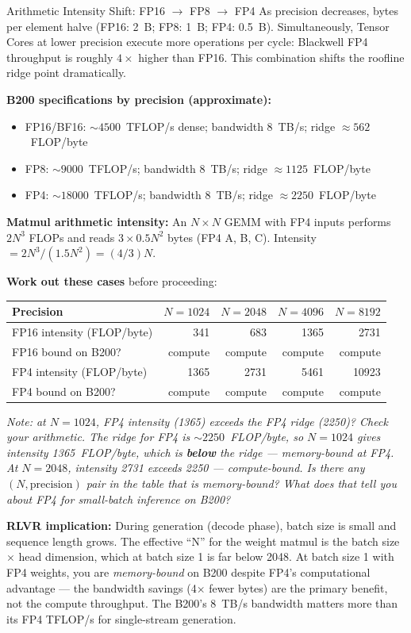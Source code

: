 \begin{thinkfirst}{Arithmetic Intensity Shift: FP16 $\to$ FP8 $\to$ FP4}
As precision decreases, bytes per element halve (FP16: 2~B; FP8: 1~B; FP4: 0.5~B). Simultaneously, Tensor Cores at lower precision execute more operations per cycle: Blackwell FP4 throughput is roughly $4\times$ higher than FP16. This combination shifts the roofline ridge point dramatically.

\textbf{B200 specifications by precision (approximate):}
\begin{itemize}
  \item FP16/BF16: $\sim 4500$~TFLOP/s dense; bandwidth 8~TB/s; ridge $\approx 562$~FLOP/byte
  \item FP8: $\sim 9000$~TFLOP/s; bandwidth 8~TB/s; ridge $\approx 1125$~FLOP/byte
  \item FP4: $\sim 18000$~TFLOP/s; bandwidth 8~TB/s; ridge $\approx 2250$~FLOP/byte
\end{itemize}

\textbf{Matmul arithmetic intensity:} An $N \times N$ GEMM with FP4 inputs performs $2N^3$ FLOPs and reads $3 \times 0.5N^2$ bytes (FP4 A, B, C). Intensity $= 2N^3 / (1.5N^2) = (4/3)N$.

\textbf{Work out these cases} before proceeding:

\begin{center}
\begin{tabular}{lrrrr}
\hline
\textbf{Precision} & $N=1024$ & $N=2048$ & $N=4096$ & $N=8192$ \\
\hline
FP16 intensity (FLOP/byte) & 341 & 683 & 1365 & 2731 \\
FP16 bound on B200? & compute & compute & compute & compute \\
FP4 intensity (FLOP/byte) & 1365 & 2731 & 5461 & 10923 \\
FP4 bound on B200? & compute & compute & compute & compute \\
\hline
\end{tabular}
\end{center}

\textit{Note: at $N=1024$, FP4 intensity (1365) exceeds the FP4 ridge (2250)? Check your arithmetic. The ridge for FP4 is $\sim 2250$~FLOP/byte, so $N=1024$ gives intensity 1365~FLOP/byte, which is \textbf{below} the ridge --- memory-bound at FP4. At $N=2048$, intensity 2731 exceeds 2250 --- compute-bound. Is there any $(N, \text{precision})$ pair in the table that is memory-bound? What does that tell you about FP4 for small-batch inference on B200?}

\textbf{RLVR implication:} During generation (decode phase), batch size is small and sequence length grows. The effective ``N'' for the weight matmul is the batch size $\times$ head dimension, which at batch size 1 is far below 2048. At batch size 1 with FP4 weights, you are \textit{memory-bound} on B200 despite FP4's computational advantage --- the bandwidth savings (4$\times$ fewer bytes) are the primary benefit, not the compute throughput. The B200's 8~TB/s bandwidth matters more than its FP4 TFLOP/s for single-stream generation.
\end{thinkfirst}

